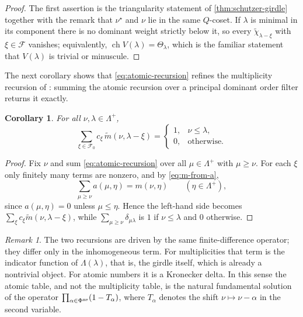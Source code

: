 \documentclass[11pt]{article}
\newtheorem{corollary}[corollary]{Corollary}
\theoremstyle{definition}
\theoremstyle{remark}
\newtheorem{remark}[remark]{Remark}
\newcommand{\Raiz}{\Phi}
\newcommand{\RaizReti}{Q}
\newcommand{\Pesos}{\Lambda}
\newcommand{\chr}{\operatorname{ch}}
\begin{document}
\begin{proof}
The first assertion is the triangularity statement of
\cref{thm:schutzer-girdle} together with the remark that $\nu^\star$ and $\nu$
lie in the same $\RaizReti$-coset.  If $\lambda$ is minimal in its component
there is no dominant weight strictly below it, so every $\widetilde\chi_{\lambda-\xi}$
with $\xi\in\mathcal F$ vanishes; equivalently, $\chr V(\lambda)=\Theta_\lambda$,
which is the familiar statement that $V(\lambda)$ is trivial or minuscule.
\end{proof}

The next corollary shows that \eqref{eq:atomic-recursion} refines the
multiplicity recursion of \cite[Corollary~3.1]{Schutzer}: summing the atomic
recursion over a principal dominant order filter returns it exactly.

\begin{corollary}
\label{cor:multiplicity-recursion}
For all $\nu,\lambda\in\Pesos^+$,
\[
   \sum_{\xi\in\mathcal F_0}c_\xi\,\widetilde m(\nu,\lambda-\xi)
      =\begin{cases}1,&\nu\le\lambda,\\0,&\text{otherwise.}\end{cases}
\]
\end{corollary}

\begin{proof}
Fix $\nu$ and sum \eqref{eq:atomic-recursion} over all $\mu\in\Pesos^+$ with
$\mu\ge\nu$.  For each $\xi$ only finitely many terms are nonzero, and by
\eqref{eq:m-from-a},
\[
   \sum_{\mu\ge\nu}a(\mu,\eta)=m(\nu,\eta)
   \qquad(\eta\in\Pesos^+),
\]
since $a(\mu,\eta)=0$ unless $\mu\le\eta$.  Hence the left-hand side becomes
$\sum_\xi c_\xi\widetilde m(\nu,\lambda-\xi)$, while
$\sum_{\mu\ge\nu}\delta_{\mu\lambda}$ is $1$ if $\nu\le\lambda$ and $0$
otherwise.
\end{proof}

\begin{remark}
\label{rem:atomic-vs-multiplicity-recursion}
The two recursions are driven by the same finite-difference operator; they
differ only in the inhomogeneous term.  For multiplicities that term is the
indicator function of $\Pesos(\lambda)$, that is, the girdle itself, which is
already a nontrivial object.  For atomic numbers it is a Kronecker delta.  In
this sense the atomic table, and not the multiplicity table, is the natural
fundamental solution of the operator
$\prod_{\alpha\in\Raiz^{\rm ns}}(1-T_\alpha)$, where $T_\alpha$ denotes the
shift $\nu\mapsto\nu-\alpha$ in the second variable.
\end{remark}
\end{document}
